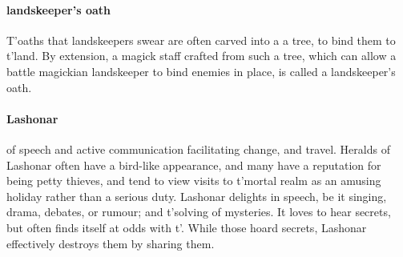 \paragraph{landskeeper's oath} T'oaths that landskeepers swear are often carved into a a tree, to bind them to t'\allowbreak land. By extension, a magick staff crafted from such a tree, which can allow a battle magickian landskeeper to bind enemies in place, is called a landskeeper's oath. 
\paragraph{Lashonar}   of speech and active communication facilitating change, and travel. Heralds of Lashonar often have a bird-like appearance, and many have a reputation for being petty thieves, and tend to view visits to t'\allowbreak mortal realm as an amusing holiday rather than a serious duty. Lashonar delights in speech, be it singing, drama, debates, or rumour; and t'\allowbreak solving of mysteries. It loves to hear secrets, but often finds itself at odds with t'\allowbreak {}. While those hoard secrets, Lashonar effectively destroys them by sharing them. 
